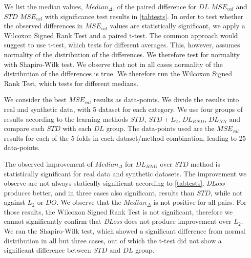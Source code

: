 \documentclass{article}
\begin{document}
We list the median values, $Median_\Delta$, of the paired difference for $DL$ $MSE_{val}$ and $STD$ $MSE_{val}$ with significance test results in \autoref{tabtests}.
In order to test whether the observed differences in $MSE_{val}$ values are statistically significant, we apply a Wilcoxon Signed Rank Test and a paired t-test.
The common approach would suggest to use t-test, which tests for different averages.
This, however, assumes normality of the distribution of the differences.
We therefore test for normality with Shapiro-Wilk test.
We observe that not in all cases normality of the distribution of the differences is true.
We therefore run the Wilcoxon Signed Rank Test, which tests for different medians.

We consider the best $MSE_{val}$ results as data-points.
We divide the results into real and synthetic data, with 5 dataset for each category.
We use four groups of results according to the learning methods $STD$, $STD+L_2$, $DL_{RND}$, $DL_{NN}$ and compare each $STD$ with each $DL$ group.
The data-points used are the $MSE_{val}$ results for each of the 5 folds in each dataset/method combination, leading to 25 data-points.

The observed improvement of $Median_\Delta$ for $DL_{RND}$ over $STD$ method is statistically significant for real data and synthetic datasets.
The improvement we observe are not always statically significant according to \autoref{tabtests}.
\emph{DLoss} produces better, and in three cases also significant, results than $STD$, while not against $L_2$ or $DO$.
We observe that the $Median_\Delta$ is not positive for all pairs.
For those results, the Wilcoxon Signed Rank Test is not significant, therefore we cannot significantly confirm that \emph{DLoss} does not produce improvement over $L_2$.
We ran the Shapiro-Wilk test, which showed a significant difference from normal distribution in all but three cases, out of which the t-test did not show a significant difference between $STD$ and $DL$ group. 
\end{document}
